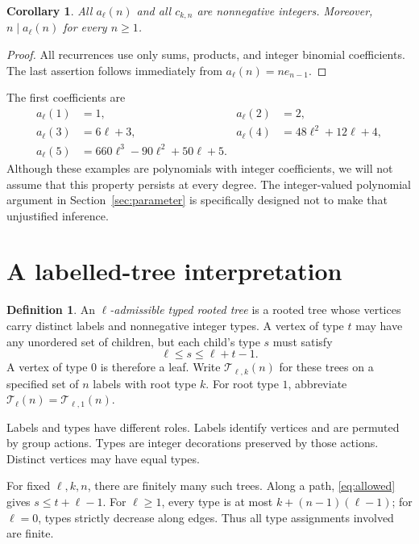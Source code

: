 \documentclass[11pt,letterpaper]{article}
\newtheorem{corollary}[theorem]{Corollary}
\theoremstyle{definition}
\newtheorem{definition}[theorem]{Definition}
\theoremstyle{remark}
\newcommand{\T}{\mathcal T}
\begin{document}
\begin{corollary}\label{cor:integrality}
All $a_\ell(n)$ and all $c_{k,n}$ are nonnegative integers. Moreover,
$n\mid a_\ell(n)$ for every $n\ge1$.
\end{corollary}
\begin{proof}
All recurrences use only sums, products, and integer binomial
coefficients. The last assertion follows immediately from
$a_\ell(n)=n e_{n-1}$.
\end{proof}

The first coefficients are
\begin{align}\label{eq:firstpolys}
 a_\ell(1)&=1,& a_\ell(2)&=2,\nonumber\\
 a_\ell(3)&=6\ell+3,& a_\ell(4)&=48\ell^2+12\ell+4,\\
 a_\ell(5)&=660\ell^3-90\ell^2+50\ell+5.\nonumber
\end{align}
Although these examples are polynomials with integer coefficients, we
will not assume that this property persists at every degree. The
integer-valued polynomial argument in Section~\ref{sec:parameter} is
specifically designed not to make that unjustified inference.

\section{A labelled-tree interpretation}\label{sec:trees}
\begin{definition}
An \emph{$\ell$-admissible typed rooted tree} is a rooted tree whose
vertices carry distinct labels and nonnegative integer types. A vertex
of type $t$ may have any unordered set of children, but each child's
type $s$ must satisfy
\begin{equation}\label{eq:allowed}
 \ell\le s\le\ell+t-1.
\end{equation}
A vertex of type $0$ is therefore a leaf. Write $\T_{\ell,k}(n)$ for
these trees on a specified set of $n$ labels with root type $k$.
For root type $1$, abbreviate $\T_\ell(n)=\T_{\ell,1}(n)$.
\end{definition}

Labels and types have different roles. Labels identify vertices and are
permuted by group actions. Types are integer decorations preserved by
those actions. Distinct vertices may have equal types.

For fixed $\ell,k,n$, there are finitely many such trees. Along a path,
\eqref{eq:allowed} gives $s\le t+\ell-1$. For $\ell\ge1$, every type is
at most $k+(n-1)(\ell-1)$; for $\ell=0$, types strictly decrease along
edges. Thus all type assignments involved are finite.
\end{document}

